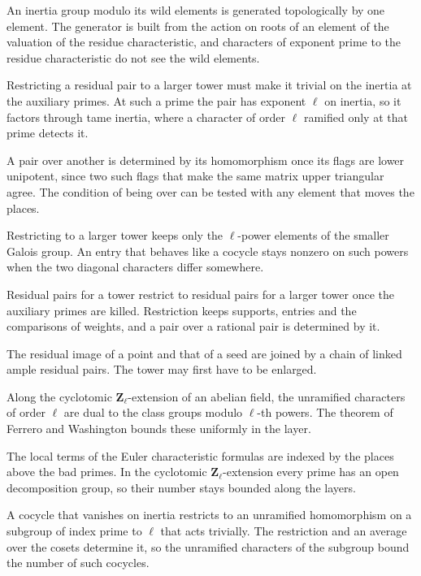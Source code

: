 An inertia group modulo its wild elements is generated topologically by one element. The generator is built from the action on roots of an element of the valuation of the residue characteristic, and characters of exponent prime to the residue characteristic do not see the wild elements.

Restricting a residual pair to a larger tower must make it trivial on the inertia at the auxiliary primes. At such a prime the pair has exponent $\ell$ on inertia, so it factors through tame inertia, where a character of order $\ell$ ramified only at that prime detects it.

A pair over another is determined by its homomorphism once its flags are lower unipotent, since two such flags that make the same matrix upper triangular agree. The condition of being over can be tested with any element that moves the places.

Restricting to a larger tower keeps only the $\ell$-power elements of the smaller Galois group. An entry that behaves like a cocycle stays nonzero on such powers when the two diagonal characters differ somewhere.

Residual pairs for a tower restrict to residual pairs for a larger tower once the auxiliary primes are killed. Restriction keeps supports, entries and the comparisons of weights, and a pair over a rational pair is determined by it.

The residual image of a point and that of a seed are joined by a chain of linked ample residual pairs. The tower may first have to be enlarged.

Along the cyclotomic $\mathbf Z_\ell$-extension of an abelian field, the unramified characters of order $\ell$ are dual to the class groups modulo $\ell$-th powers. The theorem of Ferrero and Washington bounds these uniformly in the layer.

The local terms of the Euler characteristic formulas are indexed by the places above the bad primes. In the cyclotomic $\mathbf Z_\ell$-extension every prime has an open decomposition group, so their number stays bounded along the layers.

A cocycle that vanishes on inertia restricts to an unramified homomorphism on a subgroup of index prime to $\ell$ that acts trivially. The restriction and an average over the cosets determine it, so the unramified characters of the subgroup bound the number of such cocycles.

